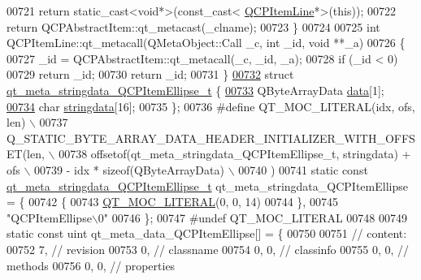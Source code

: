 \begin{DoxyCode}
00721         \textcolor{keywordflow}{return} \textcolor{keyword}{static\_cast<}\textcolor{keywordtype}{void}*\textcolor{keyword}{>}(\textcolor{keyword}{const\_cast<} \hyperlink{a00036}{QCPItemLine}*\textcolor{keyword}{>}(\textcolor{keyword}{this}));
00722     \textcolor{keywordflow}{return} QCPAbstractItem::qt\_metacast(\_clname);
00723 \}
00724 
00725 \textcolor{keywordtype}{int} QCPItemLine::qt\_metacall(QMetaObject::Call \_c, \textcolor{keywordtype}{int} \_id, \textcolor{keywordtype}{void} **\_a)
00726 \{
00727     \_id = QCPAbstractItem::qt\_metacall(\_c, \_id, \_a);
00728     \textcolor{keywordflow}{if} (\_id < 0)
00729         \textcolor{keywordflow}{return} \_id;
00730     \textcolor{keywordflow}{return} \_id;
00731 \}
\hypertarget{a00067_source_l00732}{}\hyperlink{a00067}{00732} \textcolor{keyword}{struct }\hyperlink{a00067_d3/db1/a00200}{qt\_meta\_stringdata\_QCPItemEllipse\_t} \{
\hypertarget{a00067_source_l00733}{}\hyperlink{a00067_a7efd0687e2b0fbd2c4df25855b74af30}{00733}     QByteArrayData \hyperlink{a00067_a7efd0687e2b0fbd2c4df25855b74af30}{data}[1];
\hypertarget{a00067_source_l00734}{}\hyperlink{a00067_a35ee014e43cf9f75fa027534df3b222d}{00734}     \textcolor{keywordtype}{char} \hyperlink{a00067_a35ee014e43cf9f75fa027534df3b222d}{stringdata}[16];
00735 \};
00736 \textcolor{preprocessor}{#define QT\_MOC\_LITERAL(idx, ofs, len) \(\backslash\)}
00737 \textcolor{preprocessor}{    Q\_STATIC\_BYTE\_ARRAY\_DATA\_HEADER\_INITIALIZER\_WITH\_OFFSET(len, \(\backslash\)}
00738 \textcolor{preprocessor}{    offsetof(qt\_meta\_stringdata\_QCPItemEllipse\_t, stringdata) + ofs \(\backslash\)}
00739 \textcolor{preprocessor}{        - idx * sizeof(QByteArrayData) \(\backslash\)}
00740 \textcolor{preprocessor}{    )}
00741 \textcolor{keyword}{static} \textcolor{keyword}{const} \hyperlink{a00067_d3/db1/a00200}{qt\_meta\_stringdata\_QCPItemEllipse\_t} 
      qt\_meta\_stringdata\_QCPItemEllipse = \{
00742     \{
00743 \hyperlink{a00067_a75bb9482d242cde0a06c9dbdc6b83abe}{QT\_MOC\_LITERAL}(0, 0, 14)
00744     \},
00745     \textcolor{stringliteral}{"QCPItemEllipse\(\backslash\)0"}
00746 \};
00747 \textcolor{preprocessor}{#undef QT\_MOC\_LITERAL}
00748 
00749 \textcolor{keyword}{static} \textcolor{keyword}{const} uint qt\_meta\_data\_QCPItemEllipse[] = \{
00750 
00751  \textcolor{comment}{// content:}
00752        7,       \textcolor{comment}{// revision}
00753        0,       \textcolor{comment}{// classname}
00754        0,    0, \textcolor{comment}{// classinfo}
00755        0,    0, \textcolor{comment}{// methods}
00756        0,    0, \textcolor{comment}{// properties}

\end{DoxyCode}
